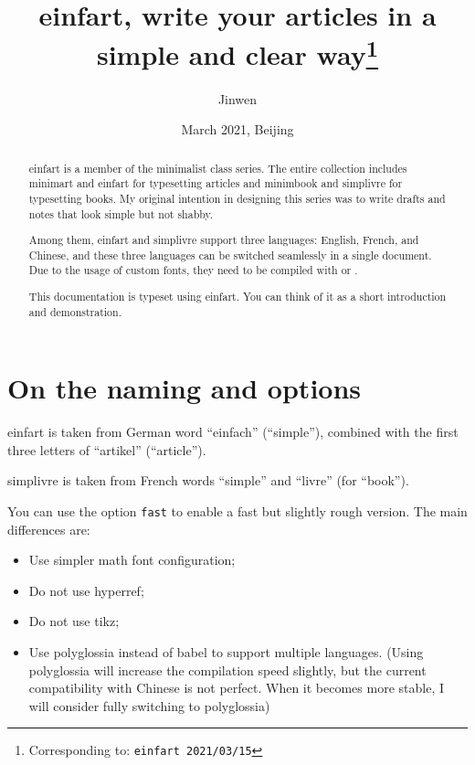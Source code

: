 \documentclass{einfart}
\providecommand{\minimalist}{\textsf{minimalist}}
\providecommand{\minimart}{\textsf{minimart}}
\providecommand{\minimbook}{\textsf{minimbook}}
\providecommand{\einfart}{\textsf{einfart}}
\providecommand{\simplivre}{\textsf{simplivre}}
\begin{document}
\title{\einfart{}, write your articles in a simple and clear way\thanks{Corresponding to: \texttt{\einfart{} 2021/03/15}}}
\author{Jinwen}
\date{March 2021, Beijing}

\maketitle

\begin{abstract}
    \einfart{} is a member of the \minimalist{} class series. The entire collection includes \minimart{} and \einfart{} for typesetting articles and \minimbook{} and \simplivre{} for typesetting books. My original intention in designing this series was to write drafts and notes that look simple but not shabby.

    Among them, \einfart{} and \simplivre{} support three languages: English, French, and Chinese, and these three languages can be switched seamlessly in a single document. Due to the usage of custom fonts, they need to be compiled with  or .
    
    This documentation is typeset using \einfart{}. You can think of it as a short introduction and demonstration.
\end{abstract}

\tableofcontents

\section{On the naming and options}
\einfart{} is taken from German word ``einfach'' (``simple''), combined with the first three letters of ``artikel'' (``article'').

\simplivre{} is taken from French words ``simple'' and ``livre'' (for ``book'').

You can use the option \verb|fast| to enable a fast but slightly rough version. The main differences are:
\begin{itemize}
    \item Use simpler math font configuration; 
    \item Do not use hyperref; 
    \item Do not use tikz; 
    \item Use polyglossia instead of babel to support multiple languages. (Using polyglossia will increase the compilation speed slightly, but the current compatibility with Chinese is not perfect. When it becomes more stable, I will consider fully switching to polyglossia)
\end{itemize}
\end{document}
